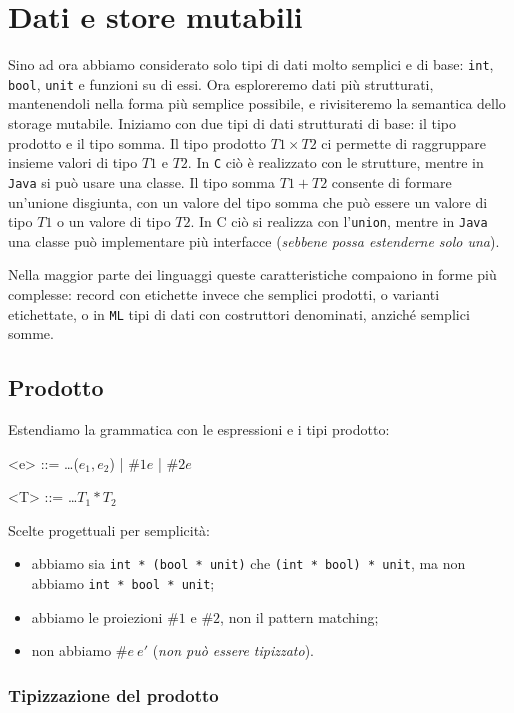 \chapter{Dati e store mutabili}
Sino ad ora abbiamo considerato solo tipi di dati molto semplici e di base:
\texttt{int}, \texttt{bool}, \texttt{unit} e funzioni su di essi. Ora esploreremo
dati più strutturati, mantenendoli nella forma più semplice possibile, e rivisiteremo
la semantica dello storage mutabile. Iniziamo con due tipi di dati strutturati di base:
il tipo prodotto e il tipo somma. Il tipo prodotto $T1 \times T2$ ci permette di raggruppare
insieme valori di tipo $T1$ e $T2$. In \texttt{C} ciò è realizzato con le strutture, mentre in \texttt{Java}
si può usare una classe. Il tipo somma $T1 + T2$ consente di formare un'unione disgiunta,
con un valore del tipo somma che può essere un valore di tipo $T1$ o un valore di
tipo $T2$. In C ciò si realizza con l'\texttt{union}, mentre in \texttt{Java} una classe può
implementare più interfacce (\textit{sebbene possa estenderne solo una}).

Nella maggior parte dei linguaggi queste caratteristiche compaiono in forme più complesse:
record con etichette invece che semplici prodotti, o varianti etichettate, o in \texttt{ML} tipi di dati 
con costruttori denominati, anziché semplici somme.
\section{Prodotto}
Estendiamo la grammatica con le espressioni e i tipi prodotto:
\begin{grammar}
    <e> ::= \dots ($e_1, e_2$) | $\#1 e$ | $\#2 e$

    <T> ::= \dots $T_1 * T_2$
\end{grammar}
Scelte progettuali per semplicità:
\begin{itemize}
    \item abbiamo sia \texttt{int * (bool * unit)}
    che \texttt{(int * bool) * unit}, ma non abbiamo \texttt{int * bool * unit};
    \item abbiamo le proiezioni $\#1$ e $\#2$, non il pattern matching;
    \item non abbiamo $\#e \ e'$ (\textit{non può essere tipizzato}).
\end{itemize}
\subsection{Tipizzazione del prodotto}
\begin{prooftree}
\end{prooftree}
\begin{prooftree}
\end{prooftree}
\begin{prooftree}
\end{prooftree}
